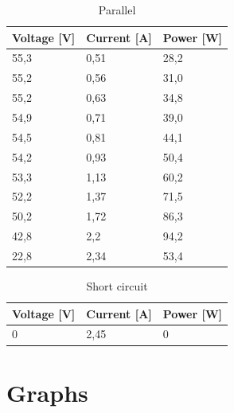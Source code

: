\documentclass[12pt]{article}
\begin{document}
\begin{table}[!h]
	\centering
	\begin{tabular}{|p{2cm}|p{2cm}|p{2cm}|}
		\hline
		\rowcolor{RedOrange!80} Voltage [V] & Current [A] & Power [W] \\
		\hline
		\rowcolor{Peach!70}   55,3          & 0,51        & 28,2      \\
		\hline
		\rowcolor{Melon!70}     55,2        & 0,56        & 31,0      \\
		\hline
		\rowcolor{Peach!70}      55,2       & 0,63        & 34,8      \\
		\hline
		\rowcolor{Melon!70}        54,9     & 0,71        & 39,0      \\
		\hline
		\rowcolor{Peach!70}        54,5     & 0,81        & 44,1      \\
		\hline
		\rowcolor{Melon!70}    54,2         & 0,93        & 50,4      \\
		\hline
		\rowcolor{Peach!70}    53,3         & 1,13        & 60,2      \\
		\hline
		\rowcolor{Melon!70}     52,2        & 1,37        & 71,5      \\
		\hline
		\rowcolor{Peach!70}      50,2       & 1,72        & 86,3      \\
		\hline
		\rowcolor{Melon!70}       42,8      & 2,2         & 94,2      \\
		\hline
		\rowcolor{Peach!70}        22,8     & 2,34        & 53,4      \\
		\hline
	\end{tabular}
	\caption{Parallel}
	\label{tab:my_label}
\end{table}

\begin{table}[!h]
	\centering
	\begin{tabular}{|p{2cm}|p{2cm}|p{2cm}|}
		\hline
		\rowcolor{Red!80} Voltage [V] & Current [A] & Power [W] \\
		\hline
		\rowcolor{Red!60} 0           & 2,45        & 0         \\
		\hline
	\end{tabular}
	\caption{Short circuit}
	\label{tab:my_label}
\end{table}
\vfill
\newpage
\FloatBarrier

\section{Graphs}
\end{document}
